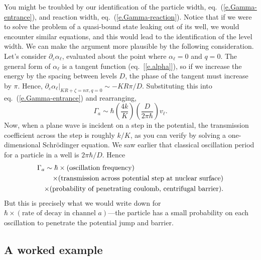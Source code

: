 You might be troubled by our identification of the particle width, eq.~(\ref{e.Gamma-entrance}), and reaction width, eq.~(\ref{e.Gamma-reaction}). Notice that if we were to solve the problem of a quasi-bound state leaking out of its well, we would encounter similar equations, and this would lead to the identification of the level width.  We can make the argument more plausible by the following consideration.  Let's consider $\partial_{\varepsilon}\alpha_{\ell}$, evaluated about the point where $\alpha_{\ell} = 0$ and $q= 0$.  The general form of $\alpha_{\ell}$ is a tangent function (eq.~[\ref{e.alpha}]), so if we increase the energy by the spacing between levels $D$, the phase of the tangent must increase by $\pi$.  Hence, $\partial_{\varepsilon}\alpha_{\ell}|_{KR + \zeta = n\pi, q=0} \sim -KR\pi/D$. Substituting this into eq.~(\ref{e.Gamma-entrance}) and rearranging,
\[
\Gamma_{a} \sim \hbar \left(\frac{4k}{K}\right)\left(\frac{D}{2\pi\hbar}\right)v_{\ell}.
\]
Now, when a plane wave is incident on a step in the potential, the transmission coefficient across the step is roughly $k/K$, as you can verify by solving a one-dimensional Schr\"odinger equation.  We saw earlier that classical oscillation period for a particle in a well is $2\pi\hbar/D$. Hence 
\begin{eqnarray*}
\lefteqn{\Gamma_{a} \sim \hbar\times(\textrm{oscillation frequency})}\\
&& \times(\textrm{transmission across potential step at nuclear surface})\\
 && \times(\textrm{probability of penetrating coulomb, centrifugal barrier}).
\end{eqnarray*}
But this is precisely what we would write down for $\hbar\times(\textrm{rate of decay in channel $a$})$---the particle has a small probability on each oscillation to penetrate the potential jump and barrier.

\subsection{A worked example}

